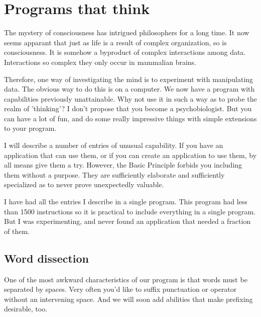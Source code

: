 \documentclass[b5paper, oneside]{book}
\begin{document}

\chapter{Programs that think}
The mystery of consciousness has intrigued philosophers for a long time. It now seems apparant that just as life is a result of complex organization, so is consciousness. It is somehow a byproduct of complex interactions among data. Interactions so complex they only occur in mammalian brains.

Therefore, one way of investigating the mind is to experiment with manipulating data. The obvious way to do this is on a computer. We now have a program with capabilities previously unattainable. Why not use it in such a way as to probe the realm of 'thinking'? I don't propose that you become a psychobiologist. But you can have a lot of fun, and do some really impressive things with simple extensions to your program.

I will describe a number of entries of unusual capability. If you have an application that can use them, or if you can create an application to use them, by all means give them a try. However, the Basic Principle forbids you including them without a purpose. They are sufficiently elaborate and sufficiently specialized as to never prove unexpectedly valuable.

I have had all the entries I describe in a single program. This program had less than 1500 instructions so it is practical to include everything in a single program. But I was experimenting, and never found an application that needed a fraction of them.

\section{Word dissection}
One of the most awkward characteristics of our program is that words must be separated by spaces. Very often you'd like to suffix punctuation or operator without an intervening space. And we will soon add abilities that make prefixing desirable, too.
\end{document}
